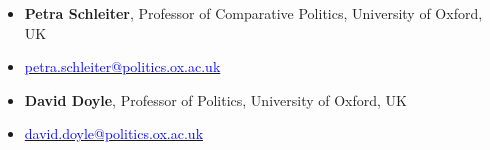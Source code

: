 





\begin{publications}

\begin{itemize}
\item[]{\small {\bfseries Petra Schleiter}, Professor of Comparative Politics, University of Oxford, UK}
\item[]{\vspace{-1mm}\textcolor{oxfordblue}{\faEnvelope} \hspace{0.1mm} {\small \href{mailto:petra.schleiter@politics.ox.ac.uk}{\textcolor{blue}{petra.schleiter@politics.ox.ac.uk}}}} \vspace{1.5mm}
\item[]{\small {\bfseries David Doyle}, Professor of Politics, University of Oxford, UK}
\item[]{\vspace{-1mm}\textcolor{oxfordblue}{\faEnvelope} \hspace{0.1mm} {\small \href{mailto:david.doyle@politics.ox.ac.uk}{\textcolor{blue}{david.doyle@politics.ox.ac.uk}}}} \vspace{1.5mm}
\end{itemize}

\end{publications}
